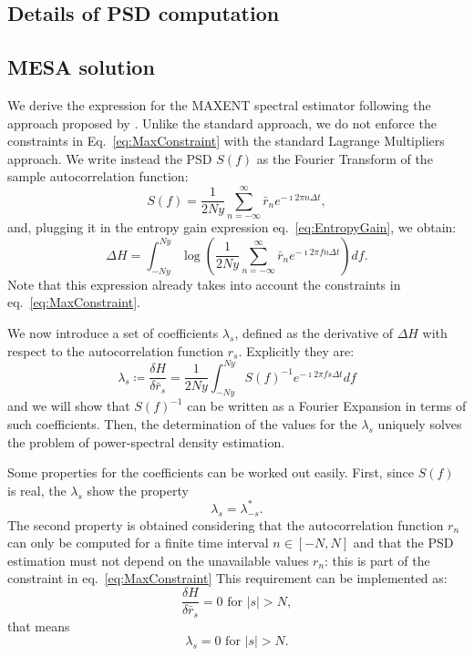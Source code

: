 \documentclass{aa}
\begin{document}
	
	

\begin{appendix}
\section{Details of PSD computation} \label{sec:appendix}
\subsection{MESA solution}\label{sec:MESA_solution}
We derive the expression for the MAXENT spectral estimator following the approach proposed by \citet{burg1975maximum}.
Unlike the standard approach, we do not enforce the constraints in Eq.~\eqref{eq:MaxConstraint} with the standard Lagrange Multipliers approach.
We write instead the PSD $S(f)$ as the Fourier Transform of the sample autocorrelation function: 
\begin{equation}
    S(f) = \frac{1}{2 Ny}\sum_{n = -\infty}^{\infty} \bar r_n e^{- \imath 2 \pi n \Delta t},
\end{equation}
and, plugging it in the entropy gain expression eq.~\eqref{eq:EntropyGain}, we obtain:
\begin{equation}
    \Delta H = \int_{-Ny}^{Ny}  
    \log\left(\frac{1}{2 Ny}\sum_{n = -\infty}^{\infty} \bar r_n e^{-\imath 2 \pi f n \Delta t} 
    \right) df.
\end{equation}
Note that this expression already takes into account the constraints in eq.~\eqref{eq:MaxConstraint}.

We now introduce a set of coefficients $\lambda_s$, defined as the derivative of $\Delta H$ with respect to the autocorrelation function $r_s$.
Explicitly they are:
\begin{equation} \label{eq:lamdas}
      \lambda_s \coloneqq \frac{\delta H}{\delta \bar r_s} = \frac{1}{2Ny}\int_{-Ny}^{Ny} S(f)^{-1}e^{-\imath 2 \pi f s \Delta t } df
\end{equation} 
and we will show that $S(f)^{-1}$ can be written as a Fourier Expansion in terms of such coefficients. Then, the determination of the values for the $\lambda_s$ uniquely solves the problem of power-spectral density estimation.

Some properties for the coefficients can be worked out easily. First, since $S(f)$ is real, the $\lambda_s$ show the property 
\begin{equation}
	\nonumber 
	\lambda_s = \lambda_{-s}^*. 
\end{equation}
The second property is obtained considering that the autocorrelation function $r_n$ can only be computed for a finite time interval $n \in [-N, N]$ and that the PSD estimation must not depend on the unavailable values $r_n$: this is part of the constraint in eq.~\eqref{eq:MaxConstraint}
This requirement can be implemented as:  
\begin{equation}\nonumber 
    \frac{\delta H}{\delta \bar r_s} = 0 \text{ for } \vert s \vert > N,
\end{equation}
that means 
\begin{equation}
\nonumber 
\lambda_s = 0 \text{ for } \vert s \vert > N. 
\end{equation}


\end{appendix}
\end{document}
